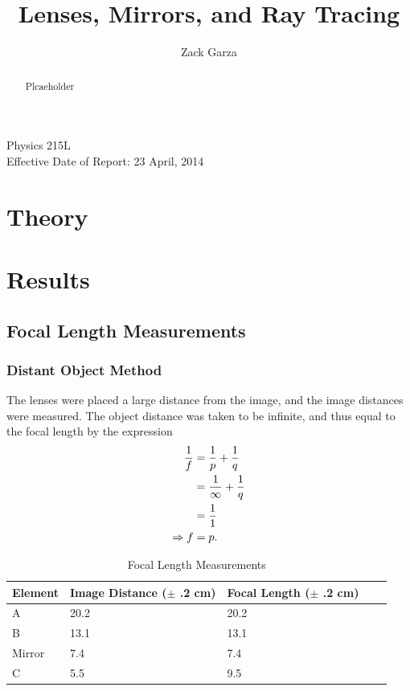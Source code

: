 \documentclass[twocolumn,english]{IEEEtran}
\theoremstyle{plain}
\theoremstyle{plain}
\begin{document}
\title{Lenses, Mirrors, and Ray Tracing}


\author{Zack Garza}


\IEEEspecialpapernotice
{Physics 215L \\
Effective Date of Report: 23 April, 2014 }



\maketitle
\begin{abstract}
Plcaeholder
\end{abstract}
\tableofcontents


\section{Theory}

\section{Results}

\subsection{Focal Length Measurements}

\subsubsection{Distant Object Method}

The lenses were placed a large distance from the image, and the image distances were measured. The object distance was taken to be infinite, and thus equal to the focal length by the expression
\begin{align}
	\frac{1}{f} &= \frac{1}{p} + \frac{1}{q} \notag \\
	&= \frac{1}{\infty} + \frac{1}{q} \notag \\
	&= \frac{1}{1} \notag \\
	\Rightarrow f &= p.
\end{align}

\begin{table}[H]
	\caption{Focal Length Measurements}
	\label{tb:focal_length}
	\centering
	\begin{tabular}{@{}lllll@{}}
	\toprule
	Element	& Image Distance ($\pm$ .2 cm) 	& Focal Length ($\pm$ .2 cm)  \\ \midrule
	A 		& 20.2			& 20.2 	\\
	B 		& 13.1 			& 13.1 	\\
	Mirror 	& 7.4  			& 7.4 	\\
	C 		& 5.5			& 9.5 	\\ \bottomrule
	\end{tabular}
\end{table}
\end{document}

